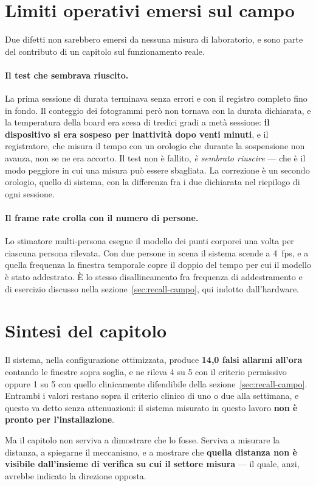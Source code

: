 \section{Limiti operativi emersi sul campo}
\label{sec:limiti-operativi}

Due difetti non sarebbero emersi da nessuna misura di laboratorio, e sono parte del contributo di un capitolo sul funzionamento reale.

\paragraph{Il test che sembrava riuscito.} La prima sessione di durata terminava senza errori e con il registro completo fino in fondo. Il conteggio dei fotogrammi però non tornava con la durata dichiarata, e la temperatura della board era scesa di tredici gradi a metà sessione: \textbf{il dispositivo si era sospeso per inattività dopo venti minuti}, e il registratore, che misura il tempo con un orologio che durante la sospensione non avanza, non se ne era accorto. Il test non è fallito, \emph{è sembrato riuscire} --- che è il modo peggiore in cui una misura può essere sbagliata. La correzione è un secondo orologio, quello di sistema, con la differenza fra i due dichiarata nel riepilogo di ogni sessione.

\paragraph{Il frame rate crolla con il numero di persone.} Lo stimatore multi-persona esegue il modello dei punti corporei una volta per ciascuna persona rilevata. Con due persone in scena il sistema scende a 4~fps, e a quella frequenza la finestra temporale copre il doppio del tempo per cui il modello è stato addestrato. È lo stesso disallineamento fra frequenza di addestramento e di esercizio discusso nella sezione~\ref{sec:recall-campo}, qui indotto dall'hardware.

\section{Sintesi del capitolo}

Il sistema, nella configurazione ottimizzata, produce \textbf{14,0 falsi allarmi all'ora} contando le finestre sopra soglia, e ne rileva 4 su 5 con il criterio permissivo oppure 1 su 5 con quello clinicamente difendibile della sezione~\ref{sec:recall-campo}. Entrambi i valori restano sopra il criterio clinico di uno o due alla settimana, e questo va detto senza attenuazioni: il sistema misurato in questo lavoro \textbf{non è pronto per l'installazione}.

Ma il capitolo non serviva a dimostrare che lo fosse. Serviva a misurare la distanza, a spiegarne il meccanismo, e a mostrare che \textbf{quella distanza non è visibile dall'insieme di verifica su cui il settore misura} --- il quale, anzi, avrebbe indicato la direzione opposta.
